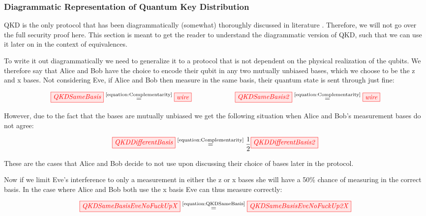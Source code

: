 \documentclass[]{article}
\newcommand{\equaltext}[1]{\ensuremath{\stackrel{\text{#1}}{=}}}
\begin{document}
\subsubsection{Diagrammatic Representation of Quantum Key Distribution}
QKD is the only protocol that has been diagrammatically (somewhat) thoroughly discussed in literature \cite{Kissinger2017}. Therefore, we will not go over the full security proof here. This section is meant to get the reader to understand the diagrammatic version of QKD, such that we can use it later on in the context of equivalences.

 To write it out diagrammatically we need to generalize it to a protocol that is not dependent on the physical realization of the qubits. We therefore say that Alice and Bob have the choice to encode their qubit in any two mutually unbiased bases, which we choose to be the z and x bases. Not considering Eve, if Alice and Bob then measure in the same basis, their quantum state is sent through just fine:

\begin{equation}
	\label{equation:QKDSameBasis}
	\tikzfig{QKDSameBasis} \equaltext{\ref{equation:Complementarity}} \tikzfig{wire} ~~~~~~~~~~~~~~~~~~~ \tikzfig{QKDSameBasis2} \equaltext{\ref{equation:Complementarity}} \tikzfig{wire}
\end{equation}

However, due to the fact that the bases are mutually unbiased we get the following situation when Alice and Bob's measurement bases do not agree:

\begin{equation}
\label{equation:QKDDifferentBasis}
\tikzfig{QKDDifferentBasis} \equaltext{\ref{equation:Complementarity}} \frac{1}{2} \tikzfig{QKDDifferentBasis2}
\end{equation}

These are the cases that Alice and Bob decide to not use upon discussing their choice of bases later in the protocol.

Now if we limit Eve's interference to only a measurement in either the z or x bases she will have a 50\% chance of measuring in the correct basis. In the case where Alice and Bob both use the x basis Eve can thus measure correctly:

\begin{equation}
	\tikzfig{QKDSameBasisEveNoFuckUpX} \equaltext{\ref{equation:QKDSameBasis}} \tikzfig{QKDSameBasisEveNoFuckUp2X} 
\end{equation}
\end{document}
